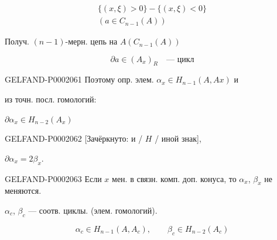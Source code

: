 \begin{gather*}\{(x,\xi)>0\}-\{(x,\xi)<0\}\\(a\in C_{n-1}(A))\end{gather*}



Получ. $(n-1)$-мерн. цепь на $A$\quad$(C_{n-1}(A))$



\begin{equation*}\partial a\in(A_x)_R\quad\text{--- цикл}\end{equation*}



\begin{GelfandAdjacentEvidence}{GELFAND-P000206}{1}
Поэтому опр. элем. $\alpha_x\in H_{n-1}(A,Ax)$ и
\end{GelfandAdjacentEvidence}

из точн. посл. гомологий:



$\partial\alpha_x\in H_{n-2}(A_x)$



\begin{GelfandAdjacentEvidence}{GELFAND-P000206}{2}
[Зачёркнуто: и / $H$ / иной знак],
\end{GelfandAdjacentEvidence}

$\partial\alpha_x=2\beta_x$.



\begin{GelfandAdjacentEvidence}{GELFAND-P000206}{3}
Если $x$ мен. в связн. комп. доп. конуса, то $\alpha_x$, $\beta_x$ не меняются.



\end{GelfandAdjacentEvidence}

$\alpha_c$, $\beta_c$ --- соотв. циклы. (элем. гомологий).



\begin{equation*}\alpha_c\in H_{n-1}(A,A_c),\qquad\beta_c\in H_{n-2}(A_c)\end{equation*}



